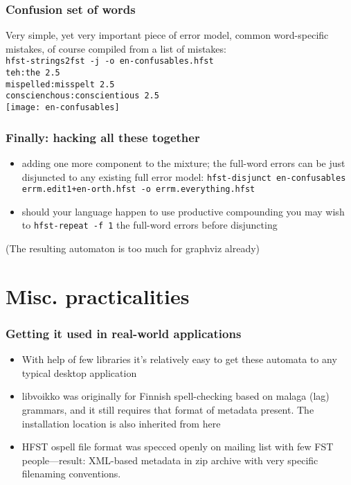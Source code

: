 \documentclass[t,12pt]{beamer}
\begin{document}
\begin{frame}
    \frametitle{Confusion set of words}
    Very simple, yet very important piece of error model, common word-specific
    mistakes, of course compiled from a list of mistakes:\\
    \texttt{hfst-strings2fst -j -o en-confusables.hfst\\
    teh:the	2.5\\
    mispelled:misspelt	2.5\\
    conscienchous:conscientious	2.5}\\
    \texttt{[image: en-confusables]}
\end{frame}

\begin{frame}
    \frametitle{Finally: hacking all these together}
    \begin{itemize}
        \item adding one more component to the mixture; the full-word errors
            can be just disjuncted to any existing full error model:
            \texttt{hfst-disjunct en-confusables errm.edit1+en-orth.hfst
            -o errm.everything.hfst}
        \item should your language happen to use productive compounding you may
            wish to \texttt{hfst-repeat -f 1} the full-word errors before
            disjuncting
    \end{itemize}
    (The resulting automaton is too much for graphviz already)
\end{frame}

\section{Misc. practicalities}

\begin{frame}
    \frametitle{Getting it used in real-world applications}
    \begin{itemize}
        \item With help of few libraries it's relatively easy to get these
            automata to any typical desktop application
        \item libvoikko was originally for Finnish spell-checking based
            on malaga (lag) grammars, and it still requires that format of
            metadata present. The installation location is also inherited from
            here
        \item HFST ospell file format 
            was specced openly on mailing list with few FST people---result:
            XML-based metadata in zip archive with very specific filenaming
            conventions.
    \end{itemize}
\end{frame}
\end{document}

